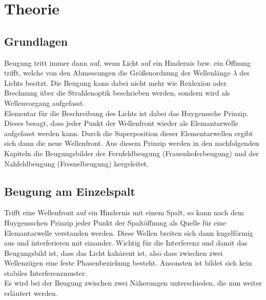 \section{Theorie}
\label{sec:Theorie}
\subsection{Grundlagen}
\label{sec:grundlagen}
Beugung tritt immer dann auf, wenn Licht auf ein Hindernis bzw. ein Öffnung trifft, welche von den Abmessungen die Größenordnung der Wellenlänge $\lambda$ des Lichts
besitzt. Die Beugung kann dabei nicht mehr wie Rexlexion oder Brechnung über die Strahlenoptik beschrieben werden, sondern wird als Wellenvorgang
aufgefasst.
\\\noindent
Elementar für die Beschreibung des Lichts ist dabei das Huygenssche Prinzip. Dieses besagt, dass jeder Punkt der Wellenfront wieder als Elemantarwelle
aufgefasst werden kann. Durch die Superposition dieser Elementarwellen ergibt sich dann die neue Wellenfront. Aus diesem Prinzip werden in den nachfolgenden
Kapiteln die Beugungsbilder der Fernfeldbeugung (Frauenhoferbeugung) und der Nahfeldbeugung (Fresnelbeugung) hergeleitet. 

\subsection{Beugung am Einzelspalt}
\label{sec:einzel}
Trifft eine Wellenfront auf ein Hindernis mit einem Spalt, so kann nach dem Huygensschen Prinzip jeder Punkt der Spaltöffnung als Quelle für eine Elemantarwelle
verstanden werden. Diese Wellen breiten sich dann kugelförmig aus und interferieren mit einander. Wichtig für die Interferenz und damit das Beugungsbild ist,
dass das Licht kahärent ist, also dass zwischen zwei Wellenzügen eine feste Phasenbeziehung besteht. Ansonsten ist bildet sich kein stabiles Interferenzmuster.
\\\noindent
Es wird bei der Beugung zwischen zwei Näherungen unterschieden, 
die nun weiter erläutert werden.

